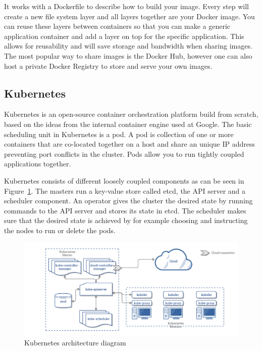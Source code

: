 It works with a Dockerfile to describe how to build your image. Every step will create a new file system layer and all layers together are your Docker image. You can reuse these layers between containers so that you can make a generic application container and add a layer on top for the specific application. This allows for reusability and will save storage and bandwidth when sharing images. The most popular way to share images is the Docker Hub, however one can also host a private Docker Registry to store and serve your own images.

\subsection{Kubernetes}
\label{subsec:kubernetes}
Kubernetes is an open-source container orchestration platform build from scratch, based on the ideas from the internal container engine used at Google. The basic scheduling unit in Kubernetes is a pod. A pod is collection of one or more containers that are co-located together on a host and share an unique IP address preventing port conflicts in the cluster. Pods allow you to run tightly coupled applications together.

Kubernetes consists of different loosely coupled components as can be seen in Figure~\ref{fig:k8s-arch}. The masters run a key-value store called etcd\cite{etcd}, the API server and a scheduler component. An operator gives the cluster the desired state by running commands to the API server and stores its state in etcd. The scheduler makes sure that the desired state is achieved by for example choosing and instructing the nodes to run or delete the pods.

\begin{figure}
    \centering
    \includegraphics[width=1\columnwidth]{images/k8s-arch}
    \caption{Kubernetes architecture diagram\cite{k8s_arch}}
    \label{fig:k8s-arch}
\end{figure}

